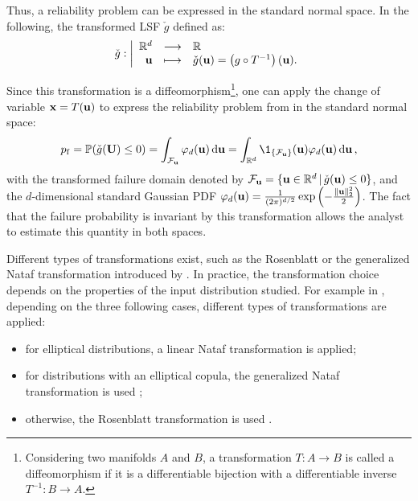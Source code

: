 Thus, a reliability problem can be expressed in the standard normal space. 
In the following, the transformed LSF $\check{g}$ defined as: 
\begin{equation}
    \check{g} : \bigg|
    \begin{array}{rcl}
        \mathbb{R}^d & \longrightarrow & \mathbb{R}\\
        {\bf u} & \longmapsto & \check{g}({\bf u}) = \left(g \circ T^{-1}\right)({\bf u}).
    \end{array}
\end{equation}

Since this transformation is a diffeomorphism\footnote{Considering two manifolds $A$ and $B$, a transformation $T: A \rightarrow B$ is called a diffeomorphism if it is a differentiable bijection with a differentiable inverse $T^{-1}: B \rightarrow A$.}, 
one can apply the change of variable ${\bf x} = T({\bf u})$ to express the reliability problem from  in the standard normal space: 
\begin{equation}
    \pf = \P(\cg(\bU) \leq 0) 
        = \int_{\iF_\bu} \varphi_d(\bu) \, \dd\bu 
        = \int_{\R^d} \1_{\{\iF_\bu\}}(\bu) \varphi_d(\bu) \, \dd\bu \,,
\end{equation}
with the transformed failure domain denoted by $\mathcal{F}_{\bf u} = \{{\bf u} \in \mathbb{R}^d \, | \, \check{g}({\bf u}) \leq 0\}$, 
and the $d$-dimensional standard Gaussian PDF $\varphi_d({\bf u}) = \frac{1}{(2\pi)^{d/2}} \exp\left(-\frac{\lVert{\bf u}\rVert^2_2}{2}\right)$. 
The fact that the failure probability is invariant by this transformation allows the analyst to estimate this quantity in both spaces.  

Different types of transformations exist, such as the Rosenblatt or the generalized Nataf transformation introduced by \citet{lebrun_2013_these}. 
In practice, the transformation choice depends on the properties of the input distribution studied. 
For example in \ot, depending on the three following cases, different types of transformations are applied:
\begin{itemize}
    \item for elliptical distributions, a linear Nataf transformation is applied;
    \item for distributions with an elliptical copula, the generalized Nataf transformation is used \citep{lebrun_2009};
    \item otherwise, the Rosenblatt transformation is used \citep{lebrun_2009_dotheydiff}.
\end{itemize} 



